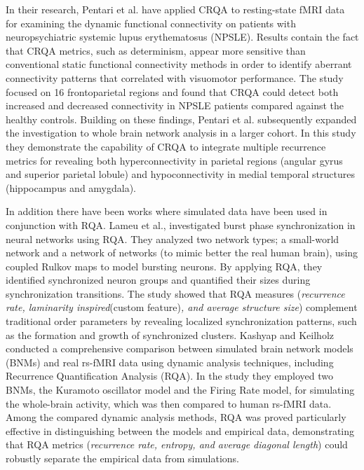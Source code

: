 \documentclass{article}
\begin{document}
			In their research, Pentari et al.\cite{pentari22} have applied CRQA to resting-state fMRI data 
			for examining the dynamic functional connectivity on patients with neuropsychiatric systemic 
			lupus erythematosus (NPSLE). Results contain the fact that CRQA metrics, such as determinism,
			appear more sensitive than conventional static functional connectivity methods in order to
			identify aberrant connectivity patterns that correlated with visuomotor performance. 
			The study focused on 16 frontoparietal regions and found that CRQA could detect 
			both increased and decreased connectivity in NPSLE patients compared against the healthy controls. 
			Building on these findings, Pentari et al.\cite{pentari23} subsequently expanded 
			the investigation to whole brain network analysis in a larger cohort. 
			In this study they demonstrate the capability of CRQA to integrate multiple recurrence metrics 
			for revealing both hyperconnectivity in parietal regions (angular gyrus and superior parietal lobule) 
			and hypoconnectivity in medial temporal structures (hippocampus and amygdala). 

			In addition there have been works where simulated data 
			have been used in conjunction with RQA.
			Lameu et al.\cite{lameu2018}, investigated burst phase synchronization in neural networks using RQA. 
			They analyzed two network types; a small-world network and a network of networks 
			(to mimic better the real human brain), using coupled Rulkov maps to model bursting neurons. 
			By applying RQA, they identified synchronized neuron groups and quantified their 
			sizes during synchronization transitions. The study showed that RQA measures 
			(\textit{recurrence rate, laminarity inspired}(custom feature)\textit{, and average structure size}) complement 
			traditional order parameters by revealing localized synchronization patterns, 
			such as the formation and growth of synchronized clusters.
			Kashyap and Keilholz\cite{Kashyap2019} conducted a comprehensive comparison 
			between simulated brain network models (BNMs) and real rs-fMRI data using 
			dynamic analysis techniques, including Recurrence Quantification Analysis (RQA). 
			In the study they employed two BNMs, the Kuramoto oscillator model and the Firing Rate model, for simulating
			the whole-brain activity, which was then compared to human rs-fMRI data. 
			Among the compared dynamic analysis methods, RQA was proved particularly effective 
			in distinguishing between the models and empirical data, demonstrating that RQA metrics 
			(\textit{recurrence rate, entropy, and average diagonal length}) could robustly separate the empirical data from simulations. 
		   
\end{document}

